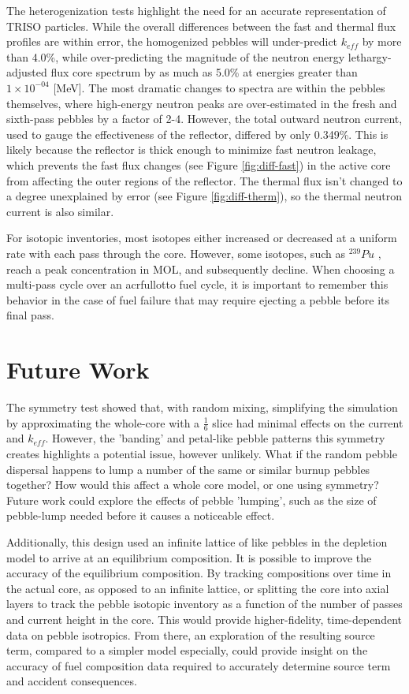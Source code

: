 The heterogenization tests highlight the need for an accurate representation of TRISO particles.  While the overall differences between the fast and thermal flux profiles are within error, the homogenized pebbles will under-predict $k_{eff}$ by more than 4.0\%, while over-predicting the magnitude of the neutron energy lethargy-adjusted flux core spectrum by as much as 5.0\% at energies greater than $1 \times 10^{-04}$ [MeV].  The most dramatic changes to spectra are within the pebbles themselves, where high-energy neutron peaks are over-estimated in the fresh and sixth-pass pebbles by a factor of 2-4.  However, the total outward neutron current, used to gauge the effectiveness of the reflector, differed by only 0.349\%.  This is likely because the reflector is thick enough to minimize fast neutron leakage, which prevents the fast flux changes (see Figure \ref{fig:diff-fast}) in the active core from affecting the outer regions of the reflector. The thermal flux isn't changed to a degree unexplained by error (see Figure \ref{fig:diff-therm}), so the thermal neutron current is also similar.

For isotopic inventories, most isotopes either increased or decreased at a uniform rate with each pass through the core.  However, some isotopes, such as $^{239}Pu$ , reach a peak concentration in MOL, and subsequently decline.  When choosing a multi-pass cycle over an acrfull{otto} fuel cycle, it is important to remember this behavior in the case of fuel failure that may require ejecting a pebble before its final pass.


\section{Future Work}

The symmetry test showed that, with random mixing, simplifying the simulation by approximating the whole-core with a $\frac{1}{6}$ slice had minimal effects on the current and $k_{eff}$.  However, the 'banding' and petal-like pebble patterns this symmetry creates highlights a potential issue, however unlikely.  What if the random pebble dispersal happens to lump a number of the same or similar burnup pebbles together?  How would this affect a whole core model, or one using symmetry?  Future work could explore the effects of pebble 'lumping', such as the size of pebble-lump needed before it causes a noticeable effect.

Additionally, this design used an infinite lattice of like pebbles in the depletion model to arrive at an equilibrium composition.  It is possible to improve the accuracy of the equilibrium composition.  By tracking compositions over time in the actual core, as opposed to an infinite lattice, or splitting the core into axial layers to track the pebble isotopic inventory as a function of the number of passes and current height in the core.  This would provide higher-fidelity, time-dependent data on pebble isotropics.  From there, an exploration of the resulting source term, compared to a simpler model especially, could provide insight on the accuracy of fuel composition data required to accurately determine source term and accident consequences.

